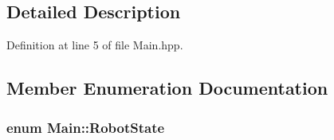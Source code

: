 \subsection{Detailed Description}


Definition at line 5 of file Main.\-hpp.



\subsection{Member Enumeration Documentation}
\hypertarget{classMain_a92ef9240246e98c3eb7cc8126982f98c}{
\subsubsection[{Robot\-State}]{\setlength{\rightskip}{0pt plus 5cm}enum {\bf Main\-::\-Robot\-State}\hspace{0.3cm}{\ttfamily [private]}}}\label{classMain_a92ef9240246e98c3eb7cc8126982f98c}
